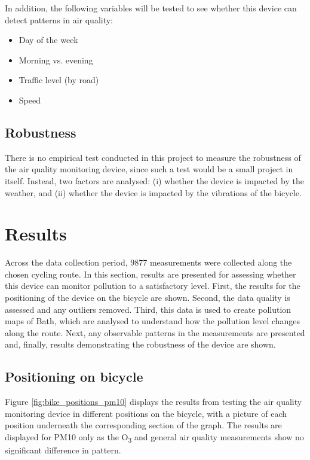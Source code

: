 \documentclass[11pt]{report}
\begin{document}
In addition, the following variables will be tested to see whether this device can detect patterns in air quality:
\begin{itemize}
\item Day of the week
\item Morning vs. evening
\item Traffic level (by road)
\item Speed
\end{itemize}

\subsection{Robustness}

There is no empirical test conducted in this project to measure the robustness of the air quality monitoring device, since such a test would be a small project in itself. Instead, two factors are analysed: (i) whether the device is impacted by the weather, and (ii) whether the device is impacted by the vibrations of the bicycle.


\section{Results} \label{results:q1}

Across the data collection period, \num{9877} measurements were collected along the chosen cycling route. In this section, results are presented for assessing whether this device can monitor pollution to a satisfactory level. First, the results for the positioning of the device on the bicycle are shown. Second, the data quality is assessed and any outliers removed. Third, this data is used to create pollution maps of Bath, which are analysed to understand how the pollution level changes along the route. Next, any observable patterns in the measurements are presented and, finally, results demonstrating the robustness of the device are shown.

\subsection{Positioning on bicycle}

Figure \ref{fig:bike_positions_pm10} displays the results from testing the air quality monitoring device in different positions on the bicycle, with a picture of each position underneath the corresponding section of the graph. The results are displayed for PM10 only as the O\textsubscript{3} and general air quality measurements show no significant difference in pattern.
\end{document}
